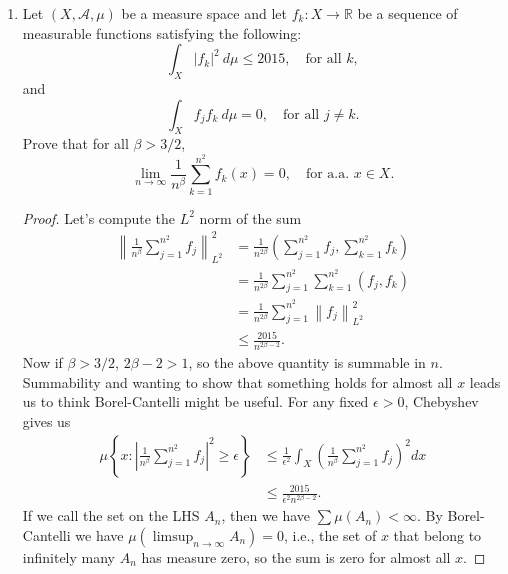 \documentclass[11pt,letterpaper]{report}
\newcommand{\reals}{\mathbb{R}}
\newcommand{\mcal}[1]{\mathcal{#1}}
\newcommand{\Lp}[2]{\left\|{#1}\right\|_{L^{#2}}}
\begin{document}
\begin{enumerate}
	\item Let $(X, \mcal{A}, \mu)$ be a measure space and let $f_k: X\to \reals$ be a sequence of measurable functions satisfying the following:
	\[
	\int_X |f_k|^2\ d\mu\leq 2015,\quad \text{for all }k,
	\]
	and
	\[
	\int_X f_jf_k\ d\mu=0,\quad \text{for all }j\neq k.
	\]
	Prove that for all $\beta>3/2$,
	\[
	\lim_{n\to \infty}\frac{1}{n^\beta}\sum_{k=1}^{n^2}f_k(x) = 0,\quad \text{for a.a. } x\in X.
	\]
	\begin{proof}
		Let's compute the $L^2$ norm of the sum
		\begin{align*}
			\left\|\frac{1}{n^\beta}\sum_{j=1}^{n^2}f_j\right\|_{L^2}^2 &= \frac{1}{n^{2\beta}}\left(\sum_{j=1}^{n^2}f_j, \sum_{k=1}^{n^2}f_k\right)\\
			&= \frac{1}{n^{2\beta}}\sum_{j=1}^{n^2}\sum_{k=1}^{n^2}(f_j, f_k)\\
			&= \frac{1}{n^{2\beta}}\sum_{j=1}^{n^2}\Lp{f_j}{2}^2\\
			&\leq \frac{2015}{n^{2\beta-2}}.
		\end{align*}
		Now if $\beta>3/2$, $2\beta-2>1$, so the above quantity is summable in $n$. Summability and wanting to show that something holds for almost all $x$ leads us to think Borel-Cantelli might be useful. For any fixed $\epsilon>0$, Chebyshev gives us
		\begin{align*}
			\mu\left\{x: \left|\frac{1}{n^\beta}\sum_{j=1}^{n^2}f_j\right|^2\geq\epsilon\right\} &\leq \frac{1}{\epsilon^2}\int_X \left(\frac{1}{n^\beta}\sum_{j=1}^{n^2}f_j\right)^2dx\\
			&\leq \frac{2015}{\epsilon^2n^{2\beta-2}}.
		\end{align*}
		If we call the set on the LHS $A_n$, then we have $\sum \mu(A_n)<\infty$. By Borel-Cantelli we have $\mu(\limsup_{n\to \infty}A_n) = 0$, i.e., the set of $x$ that belong to infinitely many $A_n$ has measure zero, so the sum is zero for almost all $x$.
	\end{proof}
\end{enumerate}
\end{document}
